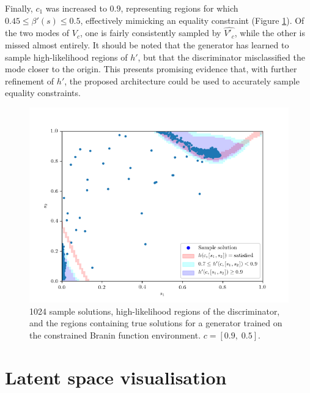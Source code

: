 \documentclass[../../main.tex]{subfiles}
\begin{document}
Finally, $c_1$ was increased to $0.9$, representing regions for which $0.45\le\beta'(s)\le0.5$, effectively mimicking an equality constraint (Figure \ref{fig:equality09}).
Of the two modes of $V_c$, one is fairly consistently sampled by $\hat{V'_c}$, while the other is missed almost entirely.
It should be noted that the generator has learned to sample high-likelihood regions of $h'$, but that the discriminator misclassified the mode closer to the origin.
This presents promising evidence that, with further refinement of $h'$, the proposed architecture could be used to accurately sample equality constraints.
\begin{figure}[H]
    \begin{center}
    \includegraphics[width=\textwidth]{equality09}
    \caption{
        1024 sample solutions, high-likelihood regions of the discriminator, and the regions containing true solutions for a generator trained on the constrained Branin function environment.
        $c=[0.9,\;0.5]$.
    }
    \label{fig:equality09}
    \end{center}
\end{figure}

\section{Latent space visualisation} \label{section:latentSpaceVisualisation}
\end{document}
